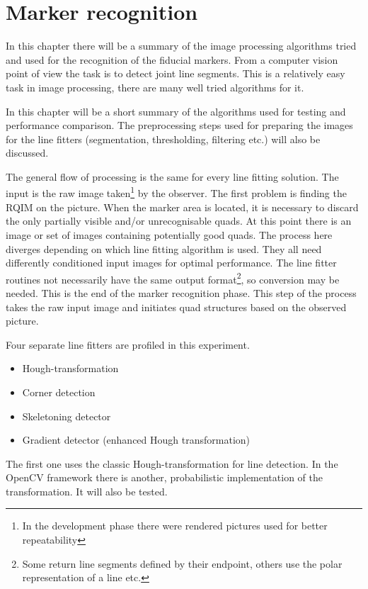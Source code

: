 \chapter{Marker recognition}\label{sect:markerRec}

In this chapter there will be a summary of the image processing algorithms tried and used for the recognition of the fiducial markers.
From a computer vision point of view the task is to detect joint line segments.
This is a relatively easy task in image processing, there are many well tried algorithms for it.

In this chapter will be a short summary of the algorithms used for testing and performance comparison.
The preprocessing steps used for preparing the images for the line fitters (segmentation, thresholding, filtering etc.) will also be discussed.

The general flow of processing is the same for every line fitting solution.
The input is the raw image taken\footnote{In the development phase there were rendered pictures used for better repeatability} by the observer.
The first problem is finding the RQIM on the picture.
When the marker area is located, it is necessary to discard the only partially visible and/or unrecognisable quads.
At this point there is an image or set of images containing potentially good quads.
The process here diverges depending on which line fitting algorithm is used.
They all need differently conditioned input images for optimal performance.
The line fitter routines not necessarily have the same output format\footnote{Some return line segments defined by their endpoint, others use the polar representation of a line etc.}, so conversion may be needed.
This is the end of the marker recognition phase.
This step of the process takes the raw input image and initiates quad structures based on the observed picture.

Four separate line fitters are profiled in this experiment.
\begin{itemize}
	\item Hough-transformation
	\item Corner detection
	\item Skeletoning detector
	\item Gradient detector (enhanced Hough transformation)
\end{itemize}
The first one uses the classic Hough-transformation for line detection.
In the OpenCV framework there is another, probabilistic implementation of the transformation.
It will also be tested.

